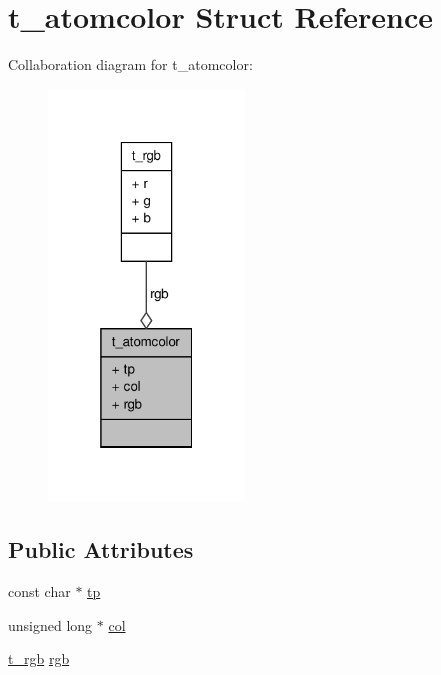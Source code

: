 \hypertarget{structt__atomcolor}{\section{t\-\_\-atomcolor \-Struct \-Reference}
\label{structt__atomcolor}
}


\-Collaboration diagram for t\-\_\-atomcolor\-:
\nopagebreak
\begin{figure}[H]
\begin{center}
\leavevmode
\includegraphics[width=148pt]{structt__atomcolor__coll__graph}
\end{center}
\end{figure}
\subsection*{\-Public \-Attributes}
\begin{DoxyCompactItemize}
\item 
const char $\ast$ \hyperlink{structt__atomcolor_aada84a709c4cf2e9d5f4be1fdd29a747}{tp}
\item 
unsigned long $\ast$ \hyperlink{structt__atomcolor_a3730bb71268ce0eefb90e4d7fac30cbb}{col}
\item 
\hyperlink{structt__rgb}{t\-\_\-rgb} \hyperlink{structt__atomcolor_a5bdaf69a9d6a9c8912f19764d6d7c8d8}{rgb}
\end{DoxyCompactItemize}


